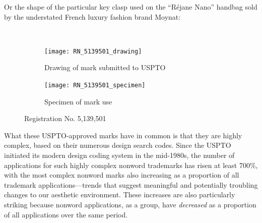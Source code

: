 \documentclass[letterpaper, 11pt, oneside]{article}
\begin{document}
\noindent Or the shape of the particular key clasp used on the ``Réjane Nano'' handbag sold by the understated French luxury fashion brand Moynat: \par \

\begin{figure}[H]
\centering
\begin{subfigure}[h]{0.4\linewidth}
\texttt{[image: RN\_5139501\_drawing]} \
\caption{Drawing of mark submitted to USPTO}
\end{subfigure}
\hspace{30pt}
\begin{subfigure}[h]{0.3\linewidth}
\texttt{[image: RN\_5139501\_specimen]} \
\caption{Specimen of mark use}
\end{subfigure}
\caption*{Registration No. 5,139,501}
\end{figure}
\par

\noindent What these USPTO-approved marks have in common is that they are highly complex, based on their numerous design search codes. Since the USPTO initiated its modern design coding system in the mid-1980s, the number of applications for such highly complex nonword trademarks has risen at least 700\%, with the most complex nonword marks also increasing as a proportion of all trademark applications—trends that suggest meaningful and potentially troubling changes to our aesthetic environment. These increases are also particularly striking because nonword applications, as a group, have \emph{decreased} as a proportion of all applications over the same period.
\end{document}
